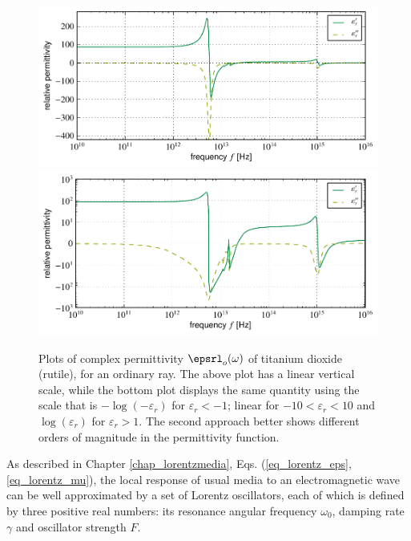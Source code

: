 \begin{figure}[t] \caption{Plots of complex permittivity ${\epsrl}_o(\omega)$ of titanium dioxide (rutile), for an ordinary ray. The above plot has a linear vertical scale, while the bottom plot displays the same quantity using the scale that is $-\log(-\varepsilon_r)$ for $\varepsilon_r<-1$; linear for $-10<\varepsilon_r<10$ and $\log(\varepsilon_r)$ for $\varepsilon_r > 1$. The second approach better shows different orders of magnitude in the permittivity function.} \label{fg_tio2eps} \centering 
	\includegraphics[width=14cm]{img/epsilon_TiO2_linear.pdf}
	\includegraphics[width=14cm]{img/epsilon_TiO2_symlog.pdf}
\end{figure}

As described in Chapter \ref{chap_lorentzmedia}, Eqs. (\ref{eq_lorentz_eps}, \ref{eq_lorentz_mu}), the local response of usual media to an electromagnetic wave can be well approximated by a set of Lorentz oscillators, each of which is defined by three positive real numbers: its resonance angular frequency $\omega_{0}$, damping rate $\gamma$ and oscillator strength $F$. %

